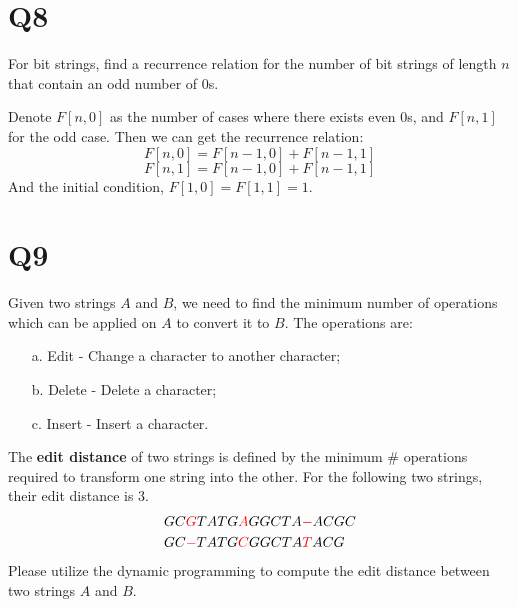 \documentclass[11pt]{article}
\begin{document}
\section*{Q8}
For bit strings, find a recurrence relation for the number of bit
strings of length $n$ that contain an odd number of 0s.
\begin{solution}
    Denote $F[n,0]$ as the number of cases where there exists even 0s, and
    $F[n,1]$ for the odd case. Then we can get the recurrence relation:
    \begin{equation*}
        F[n,0]=F[n-1,0]+F[n-1,1]
    \end{equation*}
    \begin{equation*}
        F[n,1]=F[n-1,0]+F[n-1,1]
    \end{equation*}
    And the initial condition, $F[1,0]=F[1,1]=1$.
\end{solution}

\section*{Q9}
Given two strings $A$ and $B$, we need to find the minimum number of operations which can be applied on $A$ to convert it to $B$. The operations are:
\begin{itemize}
    \item[a.] Edit - Change a character to another character;

    \item[b.] Delete - Delete a character;

    \item[c.] Insert - Insert a character.
\end{itemize}
The \textbf{edit distance} of two strings is defined by the minimum \# operations required to transform one string into the other. For the following two strings, their edit distance is 3.
\begin{align*}
    & GC\textcolor[rgb]{1.00,0.00,0.00}{G}TATG\textcolor[rgb]{1.00,0.00,0.00}{A}GGCTA\textcolor[rgb]{1.00,0.00,0.00}{-}ACGC\\
    & GC\textcolor[rgb]{1.00,0.00,0.00}{-}TATG\textcolor[rgb]{1.00,0.00,0.00}{C}GGCTA\textcolor[rgb]{1.00,0.00,0.00}{T}ACG
\end{align*}
Please utilize the dynamic programming to compute the edit distance between two strings $A$ and $B$.
\end{document}
